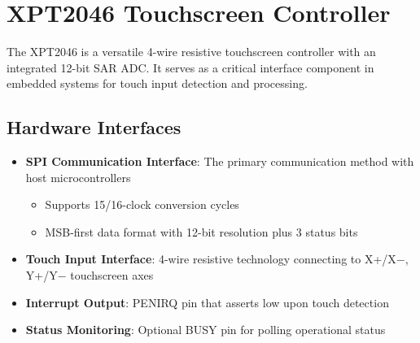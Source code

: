 %
%

\chapter{XPT2046 Touchscreen Controller}

The XPT2046 is a versatile 4-wire resistive touchscreen controller with an integrated 12-bit SAR ADC. It serves as a critical interface component in embedded systems for touch input detection and processing.

\section{Hardware Interfaces}

\begin{itemize}
	\item \textbf{SPI Communication Interface}: The primary communication method with host microcontrollers
	\begin{itemize}
		\item Supports 15/16-clock conversion cycles
		\item MSB-first data format with 12-bit resolution plus 3 status bits \cite{xpt2046:2007}
	\end{itemize}
	\item \textbf{Touch Input Interface}: 4-wire resistive technology connecting to X+/X$-$, Y+/Y$-$ touchscreen axes
	\item \textbf{Interrupt Output}: PENIRQ pin that asserts low upon touch detection
	\item \textbf{Status Monitoring}: Optional BUSY pin for polling operational status \cite{Stoffregen:2023}
\end{itemize}

